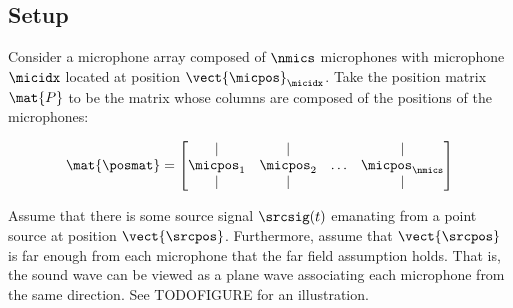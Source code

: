 \documentclass{uiucecethesis09}
\begin{document}
    \subsection{Setup}
      \label{sec:setup}
      Consider a microphone array composed of $\nmics$ microphones with 
      microphone $\micidx$ located at position $\vect{\micpos}_\micidx$. Take the position 
      matrix $\mat{P}$ to be the matrix whose columns are composed of the 
      positions of the microphones:

      \begin{equation} \label{eq:pos_mat}
        \mat{\posmat} =
          \begin{bmatrix} | & | && | \\
            \micpos_1 & \micpos_2 & \ldots & \micpos_\nmics \\
              | & | && |
          \end{bmatrix}
      \end{equation}

      Assume that there is some source signal $\srcsig(t)$ emanating from a 
      point source at position $\vect{\srcpos}$. Furthermore, assume that 
      $\vect{\srcpos}$ is far enough from each microphone that the far field 
      assumption holds. That is, the sound wave can be viewed as a plane wave 
      associating each microphone from the same direction. See TODOFIGURE for an 
      illustration. 
      
\end{document}
